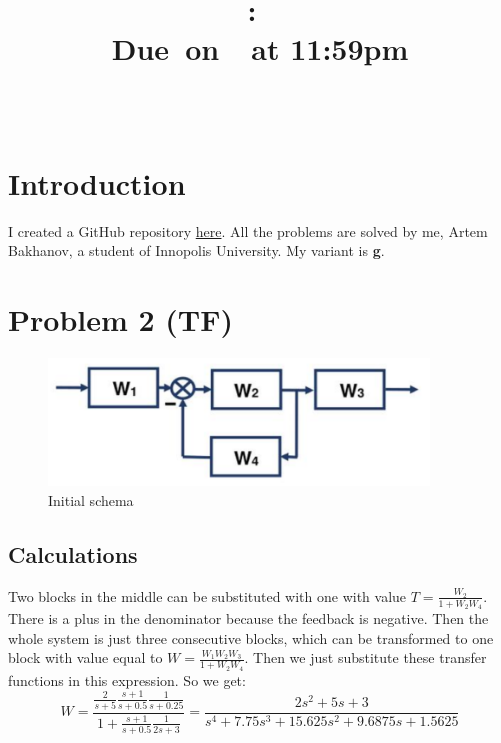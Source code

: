 \documentclass{article}
\title{
    \vspace{2in}
    \textmd{\textbf{\hmwkClass:\ \hmwkTitle}}\\
    \normalsize\vspace{0.1in}\small{Due\ on\ \hmwkDueDate\ at 11:59pm}\\
    \vspace{0.1in}\large{\textit{\hmwkClassInstructor\ }}
    \vspace{3in}
}
\author{\hmwkAuthorName}
\date{}
\begin{document}
\maketitle

\pagebreak

\tableofcontents

\pagebreak

\section{Introduction}
    I created a GitHub repository \href{https://github.com/artembakhanov/ControlTheoryHomework}{here}.
    All the problems are solved by me, Artem Bakhanov, a student of Innopolis University. My variant is \textbf{g}.
    
\section{Problem 2 (TF)}
\begin{figure}[ht]
        \centering
        \includegraphics[width=0.9\textwidth]{sources/image2_1.png}
        \caption{Initial schema}
        \label{fig:plot1c}
\end{figure}
\subsection{Calculations}
Two blocks in the middle can be substituted with one with value $T= \frac{W_2}{1 + W_2 W_4}$. There is a plus in the denominator because the feedback is negative. Then the whole system is just three consecutive blocks, which can be transformed to one block with value equal to $W = \frac{W_1 W_2 W_3}{1 + W_2 W_4}$. Then we just substitute these transfer functions in this expression. So we get:
\begin{equation}W = 
	\frac{\frac{2}{s+5} \frac{s + 1}{s + 0.5} \frac{1}{s + 0.25}}
	{1 + \frac{s + 1}{s + 0.5} \frac{1}{2s + 3}} =
	\frac{2s^2 + 5s + 3}{s^4 + 7.75s^3 + 15.625s^2 + 9.6875s + 1.5625}
\end{equation}
\end{document}
